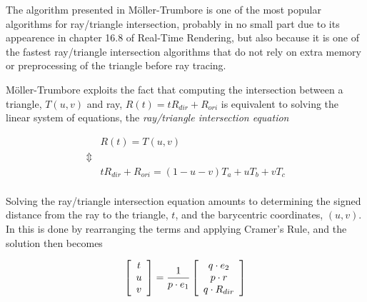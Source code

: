 The algorithm presented in Möller-Trumbore is one of
the most popular algorithms for ray/triangle intersection, probably in no small
part due to its appearence in chapter 16.8 of Real-Time
Rendering, but also because it is one of the fastest ray/triangle
intersection algorithms that do not rely on extra memory or preprocessing of the
triangle before ray tracing.


Möller-Trumbore exploits the fact that computing the
intersection between a triangle, $T(u, v)$ and ray, $R(t) = tR_{dir} + R_{ori}$ is
equivalent to solving the linear system of equations, the \textit{ray/triangle
  intersection equation}



\begin{displaymath}
  \begin{array}{rl}
    & R(t) = T(u,v) \\
    \Updownarrow \\
    & tR_{dir} + R_{ori} = (1-u-v)T_a + uT_b + vT_c \\
  \end{array}
\end{displaymath}


Solving the ray/triangle intersection equation amounts to determining the signed
distance from the ray to the triangle, $t$, and the barycentric coordinates,
$(u, v)$. In  this is done by rearranging the terms
and applying Cramer's Rule, and the solution then becomes

\begin{displaymath}
  \left[\begin{array}{c} t \\ u \\ v \end{array}\right] = \frac{1}{p \cdot e_1} 
  \left[\begin{array}{c} q \cdot e_2 \\ p \cdot r \\ q \cdot R_{dir} \end{array}\right]
\end{displaymath}

